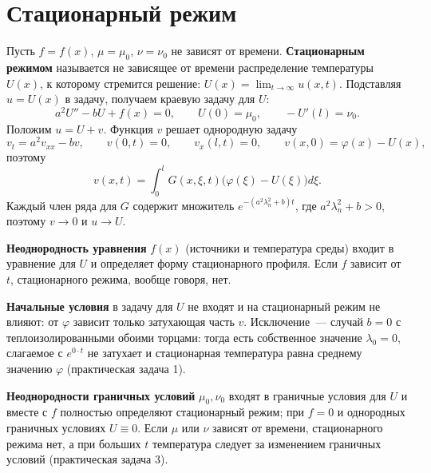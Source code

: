 \section{Стационарный режим}
Пусть $f=f(x)$, $\mu=\mu_0$, $\nu=\nu_0$ не зависят от времени. \textbf{Стационарным режимом} называется не зависящее от времени распределение температуры $U(x)$, к которому стремится решение: $U(x)=\lim_{t\to\infty}u(x,t)$. Подставляя $u=U(x)$ в задачу, получаем краевую задачу для $U$:
\[
a^2U''-bU+f(x)=0,\qquad U(0)=\mu_0,\qquad -U'(l)=\nu_0 .
\]
Положим $u=U+v$. Функция $v$ решает однородную задачу
\[
v_t=a^2v_{xx}-bv,\qquad v(0,t)=0,\qquad v_x(l,t)=0,\qquad v(x,0)=\varphi(x)-U(x),
\]
поэтому
\[
v(x,t)=\int_0^lG(x,\xi,t)\bigl(\varphi(\xi)-U(\xi)\bigr)d\xi .
\]
Каждый член ряда для $G$ содержит множитель $e^{-(a^2\lambda_n^2+b)t}$, где $a^2\lambda_n^2+b>0$, поэтому $v\to0$ и $u\to U$.

\textbf{Неоднородность уравнения} $f(x)$ (источники и температура среды) входит в уравнение для $U$ и определяет форму стационарного профиля. Если $f$ зависит от $t$, стационарного режима, вообще говоря, нет.

\textbf{Начальные условия} в задачу для $U$ не входят и на стационарный режим не влияют: от $\varphi$ зависит только затухающая часть $v$. Исключение~--- случай $b=0$ с теплоизолированными обоими торцами: тогда есть собственное значение $\lambda_0=0$, слагаемое с $e^{0\cdot t}$ не затухает и стационарная температура равна среднему значению $\varphi$ (практическая задача 1).

\textbf{Неоднородности граничных условий} $\mu_0,\nu_0$ входят в граничные условия для $U$ и вместе с $f$ полностью определяют стационарный режим; при $f=0$ и однородных граничных условиях $U\equiv0$. Если $\mu$ или $\nu$ зависят от времени, стационарного режима нет, а при больших $t$ температура следует за изменением граничных условий (практическая задача 3).
